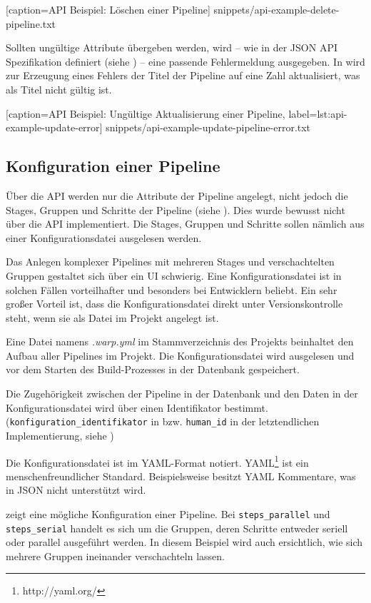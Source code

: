 
  [caption={API Beispiel: Löschen einer Pipeline}]
  {snippets/api-example-delete-pipeline.txt}

Sollten ungültige Attribute übergeben werden, wird – wie in der JSON API Spezifikation definiert (siehe ) – eine passende Fehlermeldung ausgegeben. In  wird zur Erzeugung eines Fehlers der Titel der Pipeline auf eine Zahl aktualisiert, was als Titel nicht gültig ist.


  [caption={API Beispiel: Ungültige Aktualisierung einer Pipeline},
  label={lst:api-example-update-error}]
  {snippets/api-example-update-pipeline-error.txt}


\subsection{Konfiguration einer Pipeline}

Über die API werden nur die Attribute der Pipeline angelegt, nicht jedoch die Stages, Gruppen und Schritte der Pipeline (siehe ). Dies wurde bewusst nicht über die API implementiert. Die Stages, Gruppen und Schritte sollen nämlich aus einer Konfigurationsdatei ausgelesen werden.

Das Anlegen komplexer Pipelines mit mehreren Stages und verschachtelten Gruppen gestaltet sich über ein \acf{UI} schwierig. Eine Konfigurationsdatei ist in solchen Fällen vorteilhafter und besonders bei Entwicklern beliebt. Ein sehr großer Vorteil ist, dass die Konfigurationsdatei direkt unter Versionskontrolle steht, wenn sie als Datei im Projekt angelegt ist.

Eine Datei namens \emph{.warp.yml} im Stammverzeichnis des Projekts beinhaltet den Aufbau aller Pipelines im Projekt. Die Konfigurationsdatei wird ausgelesen und vor dem Starten des Build-Prozesses in der Datenbank gespeichert.

Die Zugehörigkeit zwischen der Pipeline in der Datenbank und den Daten in der Konfigurationsdatei wird über einen Identifikator bestimmt. (\texttt{konfiguration\_\allowbreak identifikator} in  bzw. \texttt{human\_id} in der letztendlichen Implementierung, siehe )

Die Konfigurationsdatei ist im YAML-Format notiert. YAML\footnote{http://yaml.org/} ist ein menschenfreundlicher Standard. Beispielsweise besitzt YAML Kommentare, was in JSON nicht unterstützt wird.

 zeigt eine mögliche Konfiguration einer Pipeline. Bei \texttt{steps\_\allowbreak parallel} und \texttt{steps\_\allowbreak serial} handelt es sich um die Gruppen, deren Schritte entweder seriell oder parallel ausgeführt werden. In diesem Beispiel wird auch ersichtlich, wie sich mehrere Gruppen ineinander verschachteln lassen.

